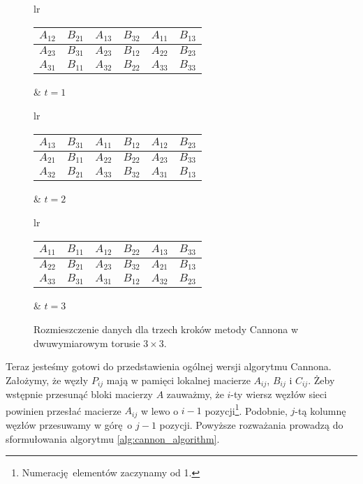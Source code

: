 \begin{figure}[H]
\centering
\begin{tabular}{lr}
\begin{tabular}{|cc|cc|cc|}
\hline
\(A_{12}\) & \(B_{21}\) & \(A_{13}\) & \(B_{32}\) & \(A_{11}\) & \(B_{13}\) \\
\hline
\(A_{23}\) & \(B_{31}\) & \(A_{23}\) & \(B_{12}\) & \(A_{22}\) & \(B_{23}\) \\
\hline
\(A_{31}\) & \(B_{11}\) & \(A_{32}\) & \(B_{22}\) & \(A_{33}\) & \(B_{33} \) \\
\hline
\end{tabular} &
\hspace{1cm}\(t=1\)
\end{tabular}
\vspace{0.5cm}

\begin{tabular}{lr}
\begin{tabular}{|cc|cc|cc|}
\hline
\(A_{13}\) & \(B_{31}\) & \(A_{11}\) & \(B_{12}\) & \(A_{12}\) & \(B_{23}\) \\
\hline
\(A_{21}\) & \(B_{11}\) & \(A_{22}\) & \(B_{22}\) & \(A_{23}\) & \(B_{33}\) \\
\hline
\(A_{32}\) & \(B_{21}\) & \(A_{33}\) & \(B_{32}\) & \(A_{31}\) & \(B_{13} \) \\
\hline
\end{tabular} &
\hspace{1cm}\(t=2\)
\end{tabular}
\vspace{0.5cm}

\begin{tabular}{lr}
\begin{tabular}{|cc|cc|cc|}
\hline
\(A_{11}\) & \(B_{11}\) & \(A_{12}\) & \(B_{22}\) & \(A_{13}\) & \(B_{33}\) \\
\hline
\(A_{22}\) & \(B_{21}\) & \(A_{23}\) & \(B_{32}\) & \(A_{21}\) & \(B_{13}\) \\
\hline
\(A_{33}\) & \(B_{31}\) & \(A_{31}\) & \(B_{12}\) & \(A_{32}\) & \(B_{23} \) \\
\hline
\end{tabular} &
\hspace{1cm}\(t=3\)
\end{tabular}
\caption{Rozmieszczenie danych dla trzech kroków metody Cannona w dwuwymiarowym torusie \(3\times 3\).}
\label{fig:cannon_last_one}
\end{figure}

Teraz jesteśmy gotowi do przedstawienia ogólnej wersji algorytmu Cannona. Założymy, że węzły \(P_{ij}\) mają w pamięci lokalnej macierze \(A_{ij}\), \(B_{ij}\) i \(C_{ij}\). Żeby wstępnie przesunąć bloki macierzy \(A\) zauważmy, że \(i\)-ty wiersz węzłów sieci powinien przesłać macierze \(A_{ij}\) w lewo o \(i-1\) pozycji\footnote{Numerację elementów zaczynamy od 1.}. Podobnie, \(j\)-tą kolumnę węzłów przesuwamy w górę o \(j-1\) pozycji. Powyższe rozważania prowadzą do sformułowania algorytmu \ref{alg:cannon_algorithm}.


